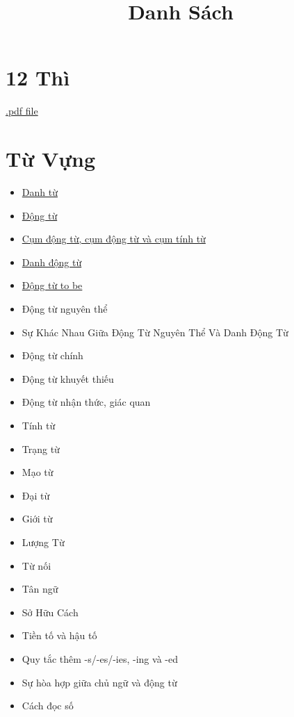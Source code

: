 \title{\Huge \textbf{Danh Sách}}
\maketitle
\tableofcontents

\chapter{12 Thì}
\href{https://github.com/theslime016/english-project/blob/main/english-project-release-files/12Tenses.pdf}
{.pdf file}
\chapter{Từ Vựng}
\begin{multicols*}{2}
    \begin{itemize}
        \item \href{https://github.com/theslime016/english-project/blob/main/english-project-release-files/Noun.pdf}{Danh từ}
        \item \href{https://github.com/theslime016/english-project/blob/main/english-project-release-files/Verb.pdf}{Động từ}
        \item \href{https://github.com/theslime016/english-project/blob/main/english-project-release-files/Phrasal.pdf}{Cụm động từ, cụm động từ và cụm tính từ}
        \item \href{https://github.com/theslime016/english-project/blob/main/english-project-release-files/Gerunds.pdf}{Danh động từ}
        \item \href{https://github.com/theslime016/english-project/blob/main/english-project-release-files/To%20be%20Verbs.pdf}{Động từ to be}
        \item Động từ nguyên thể
        \item Sự Khác Nhau Giữa Động Từ Nguyên Thể Và Danh Động Từ
        \item Động từ chính
        \item Động từ khuyết thiếu
        \item Động từ nhận thức, giác quan
        \item Tính từ
        \item Trạng từ
        \item Mạo từ
        \item Đại từ
        \item Giới từ
        \item Lượng Từ
        \item Từ nối
        \item Tân ngữ
        \item Sở Hữu Cách
        \item Tiền tố và hậu tố
        \item Quy tắc thêm -s/-es/-ies, -ing và -ed
        \item Sự hòa hợp giữa chủ ngữ và động từ
        \item Cách đọc số
    \end{itemize}
\end{multicols*}

